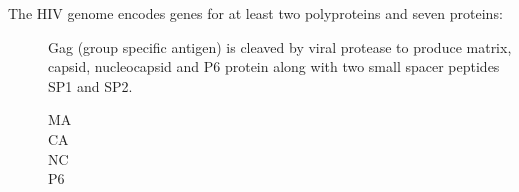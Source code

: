 \documentclass[../sherrill-Mix_thesis.tex]{subfiles}
\begin{document}
The HIV genome encodes genes for at least two polyproteins and seven proteins:\\ %
\begin{description}
	\item[\gag{}]
		Gag (group specific antigen) is cleaved by viral protease to produce matrix, capsid, nucleocapsid and P6 protein along with two small spacer peptides SP1 and SP2. 
		\begin{description}
			\item[MA]
			\item[CA]
			\item[NC]
			\item[P6]
		\end{description}
			


\end{description}
\end{document}
